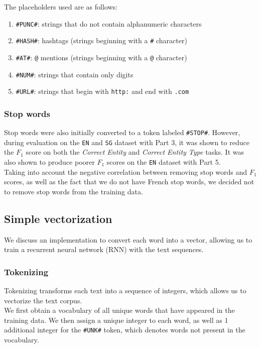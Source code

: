 \documentclass{article}
\begin{document}
The placeholders used are as follows:
\begin{enumerate}
	\item \lstinline{#PUNC#}: strings that do not contain alphanumeric characters
	\item \lstinline{#HASH#}: hashtags (strings beginning with a \lstinline{#} character)
	\item \lstinline{#AT#}: \lstinline{@} mentions (strings beginning with a \lstinline{@} character)
	\item \lstinline{#NUM#}: strings that contain only digits
	\item \lstinline{#URL#}: strings that begin with \lstinline{http:} and end with \lstinline{.com}
\end{enumerate}

\subsubsection{Stop words}
Stop words were also initially converted to a token labeled \lstinline{#STOP#}. However, during evaluation on the \lstinline{EN} and \lstinline{SG} dataset with Part 3, it was shown to reduce the $F_1$ score on both the \emph{Correct Entity} and \emph{Correct Entity Type} tasks. It was also shown to produce poorer $F_1$ scores on the \lstinline{EN} dataset with Part 5. \\

Taking into account the negative correlation between removing stop words and $F_1$ scores, as well as the fact that we do not have French stop words, we decided not to remove stop words from the training data.


\subsection{Simple vectorization}
We discuss an implementation to convert each word into a vector, allowing us to train a recurrent neural network (RNN) with the text sequences.

\subsubsection{Tokenizing}
Tokenizing transforms each text into a sequence of integers, which allows us to vectorize the text corpus.\\

We first obtain a vocabulary of all unique words that have appeared in the training data.  We then assign a unique integer to each word, as well as 1 additional integer for the \lstinline{#UNK#} token, which denotes words not present in the vocabulary.
\end{document}
